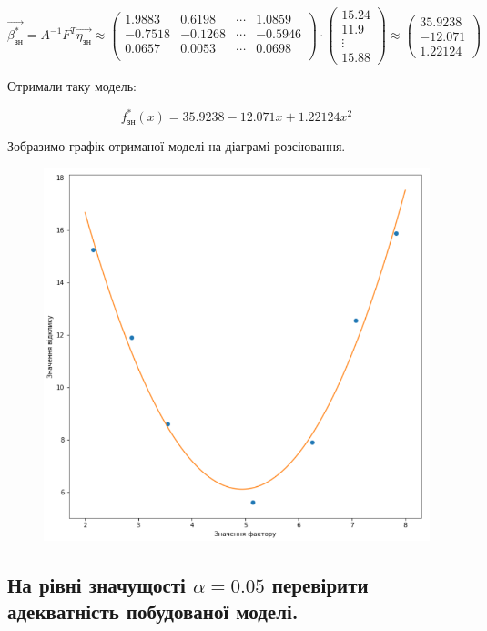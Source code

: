 \documentclass[a5paper, 20pt]{article}
\begin{document}
$$
\vec{\beta^{*}_{\text{зн}}} = A^{-1}F^T\vec{\eta_{\text{зн}}} \approx
\begin{pmatrix}
 1.9883 &  0.6198 & \cdots &  1.0859 \\
-0.7518 & -0.1268 & \cdots & -0.5946 \\
0.0657 & 0.0053 & \cdots &  0.0698 \\
\end{pmatrix}
\cdot
\begin{pmatrix}
15.24 \\
11.9 \\ 
\vdots \\
15.88
\end{pmatrix}
\approx
\begin{pmatrix}
35.9238 \\
-12.071 \\
1.22124
\end{pmatrix}
$$

Отримали таку модель:

$$f_{\text{зн}}^*(x) = 35.9238 -12.071x + 1.22124 x^2 $$

Зобразимо графік отриманої моделі на діаграмі розсіювання.
\begin{figure}[h]
\centering
\includegraphics[scale=0.54]{plot_for_first_task_2}
\end{figure}


\subsection{На рівні значущості $\alpha = 0.05$ перевірити адекватність побудованої моделі. }
\end{document}
